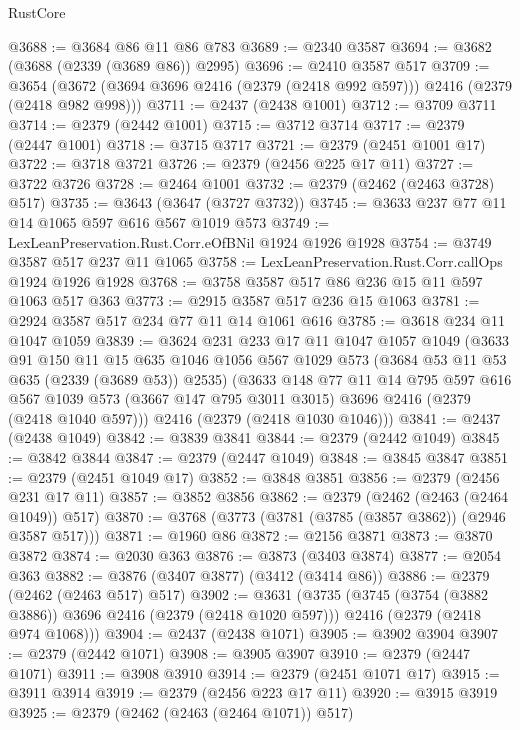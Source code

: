 \begin{lexlean}{RustCore}
\begin{coremodule}
@3688 := @3684 @86 @11 @86 @783
@3689 := @2340 @3587
@3694 := @3682 (@3688 (@2339 (@3689 @86)) @2995)
@3696 := @2410 @3587 @517
@3709 := @3654 (@3672 (@3694 @3696 @2416 (@2379 (@2418 @992 @597))) @2416 (@2379 (@2418 @982 @998)))
@3711 := @2437 (@2438 @1001)
@3712 := @3709 @3711
@3714 := @2379 (@2442 @1001)
@3715 := @3712 @3714
@3717 := @2379 (@2447 @1001)
@3718 := @3715 @3717
@3721 := @2379 (@2451 @1001 @17)
@3722 := @3718 @3721
@3726 := @2379 (@2456 @225 @17 @11)
@3727 := @3722 @3726
@3728 := @2464 @1001
@3732 := @2379 (@2462 (@2463 @3728) @517)
@3735 := @3643 (@3647 (@3727 @3732))
@3745 := @3633 @237 @77 @11 @14 @1065 @597 @616 @567 @1019 @573
@3749 := LexLeanPreservation.Rust.Corr.eOfBNil @1924 @1926 @1928
@3754 := @3749 @3587 @517 @237 @11 @1065
@3758 := LexLeanPreservation.Rust.Corr.callOps @1924 @1926 @1928
@3768 := @3758 @3587 @517 @86 @236 @15 @11 @597 @1063 @517 @363
@3773 := @2915 @3587 @517 @236 @15 @1063
@3781 := @2924 @3587 @517 @234 @77 @11 @14 @1061 @616
@3785 := @3618 @234 @11 @1047 @1059
@3839 := @3624
    @231
    @233
    @17
    @11
    @1047
    @1057
    @1049
    (@3633
      @91
      @150
      @11
      @15
      @635
      @1046
      @1056
      @567
      @1029
      @573
      (@3684 @53 @11 @53 @635 (@2339 (@3689 @53)) @2535)
      (@3633
        @148
        @77
        @11
        @14
        @795
        @597
        @616
        @567
        @1039
        @573
        (@3667 @147 @795 @3011 @3015)
        @3696
        @2416
        (@2379 (@2418 @1040 @597)))
      @2416
      (@2379 (@2418 @1030 @1046)))
@3841 := @2437 (@2438 @1049)
@3842 := @3839 @3841
@3844 := @2379 (@2442 @1049)
@3845 := @3842 @3844
@3847 := @2379 (@2447 @1049)
@3848 := @3845 @3847
@3851 := @2379 (@2451 @1049 @17)
@3852 := @3848 @3851
@3856 := @2379 (@2456 @231 @17 @11)
@3857 := @3852 @3856
@3862 := @2379 (@2462 (@2463 (@2464 @1049)) @517)
@3870 := @3768 (@3773 (@3781 (@3785 (@3857 @3862)) (@2946 @3587 @517)))
@3871 := @1960 @86
@3872 := @2156 @3871
@3873 := @3870 @3872
@3874 := @2030 @363
@3876 := @3873 (@3403 @3874)
@3877 := @2054 @363
@3882 := @3876 (@3407 @3877) (@3412 (@3414 @86))
@3886 := @2379 (@2462 (@2463 @517) @517)
@3902 := @3631
    (@3735
      (@3745 (@3754 (@3882 @3886)) @3696 @2416 (@2379 (@2418 @1020 @597)))
      @2416
      (@2379 (@2418 @974 @1068)))
@3904 := @2437 (@2438 @1071)
@3905 := @3902 @3904
@3907 := @2379 (@2442 @1071)
@3908 := @3905 @3907
@3910 := @2379 (@2447 @1071)
@3911 := @3908 @3910
@3914 := @2379 (@2451 @1071 @17)
@3915 := @3911 @3914
@3919 := @2379 (@2456 @223 @17 @11)
@3920 := @3915 @3919
@3925 := @2379 (@2462 (@2463 (@2464 @1071)) @517)

\end{coremodule}
\end{lexlean}
